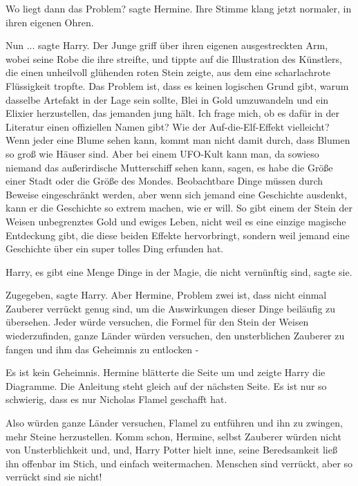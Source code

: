 \glqq{}Wo liegt dann das Problem?\grqq{} sagte Hermine. Ihre Stimme klang jetzt
normaler, in ihren eigenen Ohren.

\glqq{}Nun ...\grqq{} sagte Harry. Der Junge griff über ihren eigenen
ausgestreckten Arm, wobei seine Robe die ihre streifte, und tippte auf die
Illustration des Künstlers, die einen unheilvoll glühenden roten Stein zeigte,
aus dem eine scharlachrote Flüssigkeit tropfte. \glqq{}Das Problem ist, dass es
keinen logischen Grund gibt, warum dasselbe Artefakt in der Lage sein sollte,
Blei in Gold umzuwandeln und ein Elixier herzustellen, das jemanden jung hält.
Ich frage mich, ob es dafür in der Literatur einen offiziellen Namen gibt? Wie
der \glqq{}Auf-die-Elf-Effekt\grqq{} vielleicht? Wenn jeder eine Blume sehen
kann, kommt man nicht damit durch, dass Blumen so groß wie Häuser sind. Aber bei
einem UFO-Kult kann man, da sowieso niemand das außerirdische Mutterschiff sehen
kann, sagen, es habe die Größe einer Stadt oder die Größe des Mondes.
Beobachtbare Dinge müssen durch Beweise eingeschränkt werden, aber wenn sich
jemand eine Geschichte ausdenkt, kann er die Geschichte so extrem machen, wie er
will. So gibt einem der Stein der Weisen unbegrenztes Gold und ewiges Leben,
nicht weil es eine einzige magische Entdeckung gibt, die diese beiden Effekte
hervorbringt, sondern weil jemand eine Geschichte über ein super tolles Ding
erfunden hat.\grqq{}

\glqq{}Harry, es gibt eine Menge Dinge in der Magie, die nicht vernünftig
sind\grqq{}, sagte sie.

\glqq{}Zugegeben\grqq{}, sagte Harry. \glqq{}Aber Hermine, Problem zwei ist, dass
nicht einmal Zauberer verrückt genug sind, um die Auswirkungen dieser Dinge
beiläufig zu übersehen. Jeder würde versuchen, die Formel für den Stein der
Weisen wiederzufinden, ganze Länder würden versuchen, den unsterblichen Zauberer
zu fangen und ihm das Geheimnis zu entlocken -\grqq{}

\glqq{}Es ist kein Geheimnis.\grqq{} Hermine blätterte die Seite um und zeigte
Harry die Diagramme. \glqq{}Die Anleitung steht gleich auf der nächsten Seite. Es
ist nur so schwierig, dass es nur Nicholas Flamel geschafft hat.\grqq{}

\glqq{}Also würden ganze Länder versuchen, Flamel zu entführen und ihn zu
zwingen, mehr Steine herzustellen. Komm schon, Hermine, selbst Zauberer würden
nicht von Unsterblichkeit und, und\grqq{}, Harry Potter hielt inne, seine
Beredsamkeit ließ ihn offenbar im Stich, \glqq{}und einfach weitermachen.
Menschen sind verrückt, aber so verrückt sind sie nicht!\grqq{}

